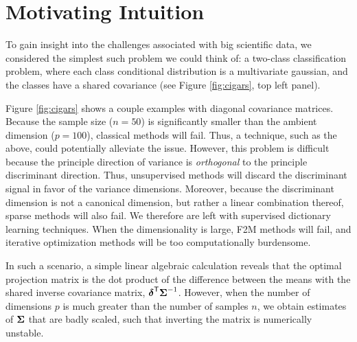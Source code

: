 \documentclass[10pt]{article}
\begin{document}
\section*{Motivating Intuition}

To gain insight into the challenges associated with big scientific data,  we considered the simplest such problem we could think of: a two-class classification problem, where each class conditional distribution is a multivariate gaussian, and the classes have a shared covariance (see Figure \ref{fig:cigars}, top left panel).  


Figure \ref{fig:cigars} shows a couple examples with diagonal covariance matrices. Because the sample size ($n=50$) is significantly smaller than the ambient dimension ($p=100$), classical methods will fail.  Thus, a technique, such as the above, could potentially alleviate the issue.  However, this problem is difficult because  the principle direction of variance is \emph{orthogonal} to the principle discriminant direction.  Thus, unsupervised methods will discard the discriminant signal in favor of the variance dimensions.  Moreover, because the discriminant dimension is not a canonical dimension, but rather a linear combination thereof, sparse methods will also fail.  We therefore are left with supervised dictionary learning techniques.  When the dimensionality is large, F2M methods will fail, and iterative optimization methods will be too computationally burdensome.  


In such a scenario, a simple linear algebraic calculation reveals that the optimal projection matrix is the dot product of the difference between the means with the shared inverse covariance matrix, $\boldsymbol{\delta}^{\mathsf{T}} \boldsymbol{\Sigma}^{-1}$.  However, when the number of dimensions $p$ is much greater than the number of samples $n$, we obtain estimates of $\boldsymbol{\Sigma}$ that are badly scaled, such that inverting the matrix is numerically unstable.  





\end{document}
